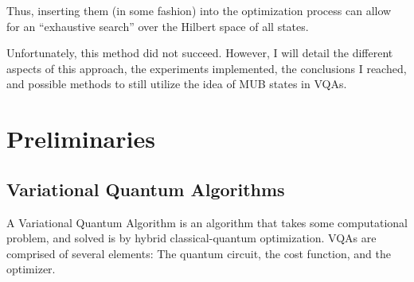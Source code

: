 \documentclass[a4paper,12pt]{article}
\begin{document}
Thus, inserting them (in some fashion) into the optimization process can allow for an ``exhaustive search'' over the Hilbert space of all states.

Unfortunately, this method did not succeed. However, I will detail the different aspects of this approach, the experiments implemented, the conclusions I reached, and possible methods to still utilize the idea of MUB states in VQAs.


\section{Preliminaries}

\subsection{Variational Quantum Algorithms}
A Variational Quantum Algorithm is an algorithm that takes some computational problem, and solved is by hybrid classical-quantum optimization.
VQAs are comprised of several elements: The quantum circuit, the cost function, and the optimizer.
\end{document}
